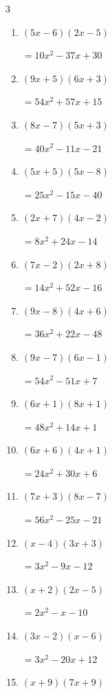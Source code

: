 \begin{multicols}{3}
\begin{enumerate}
        $=18x^{2}+48x-18$

\columnbreak %

\resetques

  \item $(5x-6)(2x-5)$

        $=10x^{2}-37x+30$

  \item $(9x+5)(6x+3)$

        $=54x^{2}+57x+15$

  \item $(8x-7)(5x+3)$

        $=40x^{2}-11x-21$

  \item $(5x+5)(5x-8)$

        $=25x^{2}-15x-40$

  \item $(2x+7)(4x-2)$

        $=8x^{2}+24x-14$

  \item $(7x-2)(2x+8)$

        $=14x^{2}+52x-16$

  \item $(9x-8)(4x+6)$

        $=36x^{2}+22x-48$

  \item $(9x-7)(6x-1)$

        $=54x^{2}-51x+7$

  \item $(6x+1)(8x+1)$

        $=48x^{2}+14x+1$

  \item $(6x+6)(4x+1)$

        $=24x^{2}+30x+6$

  \item $(7x+3)(8x-7)$

        $=56x^{2}-25x-21$

  \item $(x-4)(3x+3)$

        $=3x^{2}-9x-12$

  \item $(x+2)(2x-5)$

        $=2x^{2}-x-10$

  \item $(3x-2)(x-6)$

        $=3x^{2}-20x+12$

  \item $(x+9)(7x+9)$


\end{enumerate}
\end{multicols}
